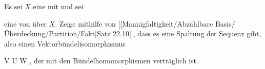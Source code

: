 \setcounter{section}{24}


{}
{

Es sei $X$ eine
mit
und sei

 {  }

eine
von
über $X$. Zeige mithilfe von
[[Mannigfaltigkeit/Abzählbare Basis/Überdeckung/Partition/Fakt|Satz 22.10]],
dass es eine Spaltung der Sequenz gibt, also einen Vektorbündelisomorphismus

\mavergleichskette
{\vergleichskette
{ V
}
{ \cong }{ U \oplus W
}
{  }{
}
{    }{
}
{   }{
}
}
{}{}{,}
der mit den Bündelhomomorphismen verträglich ist.

}
{} {}

